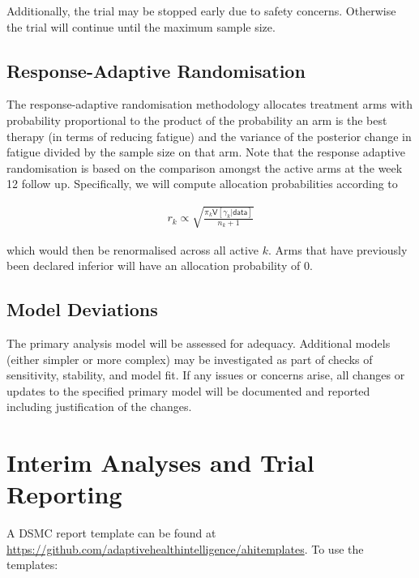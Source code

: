 \documentclass[
]{article}
\begin{document}
Additionally, the trial may be stopped early due to safety concerns.
Otherwise the trial will continue until the maximum sample size.

\hypertarget{response-adaptive-randomisation}{%
  \subsection{Response-Adaptive Randomisation}\label{response-adaptive-randomisation}}

The response-adaptive randomisation methodology allocates treatment arms with probability proportional to the product of the probability an arm is the best therapy (in terms of reducing fatigue) and the variance of the posterior change in fatigue divided by the sample size on that arm.
Note that the response adaptive randomisation is based on the comparison amongst the active arms at the week 12 follow up.
Specifically, we will compute allocation probabilities according to

\[
  \begin{aligned}
    r_{k} \propto \sqrt{ \frac{\pi_k \mathsf{V}[\gamma_k | \mathsf{data} ]}{ n_k + 1}  }
  \end{aligned}
\]

which would then be renormalised across all active $k$.
Arms that have previously been declared inferior will have an allocation probability of $0$.


\hypertarget{model-deviations}{%
  \subsection{Model Deviations}\label{model-deviations}}

The primary analysis model will be assessed for adequacy.
Additional models (either simpler or more complex) may be investigated as part of checks of sensitivity, stability, and model fit.
If any issues or concerns arise, all changes or updates to the specified primary model will be documented and reported including justification of the changes.

\clearpage

\hypertarget{interim-analyses-and-trial-reporting}{%
  \section{Interim Analyses and Trial Reporting}\label{interim-analyses-and-trial-reporting}}

A DSMC report template can be found at \url{https://github.com/adaptivehealthintelligence/ahitemplates}.
To use the templates:
\end{document}

